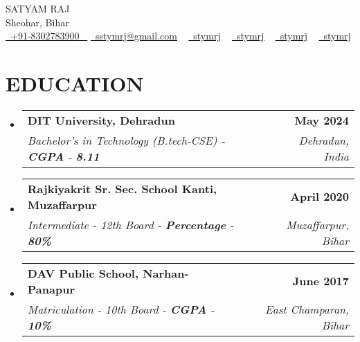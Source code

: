 \documentclass[letterpaper,11pt]{article}
\makeatletter
\newcommand{\resumeSubheading}[4]{
  \vspace{-2pt}\item
    \begin{tabular*}{1.0\textwidth}[t]{l@{\extracolsep{\fill}}r}
      \textbf{\large#1} & \textbf{\small #2} \\
      \textit{\large#3} & \textit{\small #4} \\
     
    \end{tabular*}\vspace{-7pt}
}
\newcommand{\resumeSubHeadingListStart}{\begin{itemize}[leftmargin=0.0in, label={}]}
\newcommand{\resumeSubHeadingListEnd}{\end{itemize}}
\makeatother
\begin{document}




\begin{center}
    {\Huge \scshape SATYAM RAJ} \\ \vspace{1pt}
    Sheohar, Bihar \\ \vspace{1pt}
    \small \href{tel:+xxxxxxxxxxxx}{ \raisebox{-0.1\height}\faPhone\ \underline{+91-8302783900} ~} \href{mailto:sstymrj@gmail.com}{\raisebox{-0.2\height}\faEnvelope\  \underline{sstymrj@gmail.com}} ~
    \href{https://linkedin.com/in/stymrj}{\raisebox{-0.2\height}\faLinkedinSquare\ \underline{stymrj}}  ~
    \href{https://github.com/yourid}{\raisebox{-0.2\height}\faGithub\ \underline{stymrj}} ~
    \href{https://www.hackerrank.com/stymrj}{\raisebox{-0.2\height}\faHackerrank\ \underline{stymrj}} ~
    \href{https://codeforces.com/profile/stymrj}{\raisebox{-0.2\height}\faPoll\ \underline{stymrj}}
    \vspace{-8pt}
\end{center}




\section{EDUCATION}
  \resumeSubHeadingListStart
    \resumeSubheading
      {DIT University, Dehradun}{May 2024}
      {Bachelor's in Technology (B.tech-CSE) - \textbf{CGPA} - \textbf{8.11}}{Dehradun, India}
  \resumeSubHeadingListEnd
 
  \resumeSubHeadingListStart
    \resumeSubheading
      {Rajkiyakrit Sr. Sec. School Kanti, Muzaffarpur }{April 2020}
      {Intermediate - 12th Board  - \textbf{Percentage} - \textbf{80\%}}{Muzaffarpur, Bihar}
  \resumeSubHeadingListEnd


  \resumeSubHeadingListStart
    \resumeSubheading
      {DAV Public School, Narhan-Panapur}{June 2017}
      {Matriculation - 10th Board  - \textbf{CGPA} - \textbf{10\%}}{East Champaran, Bihar}
  \resumeSubHeadingListEnd


\end{document}
